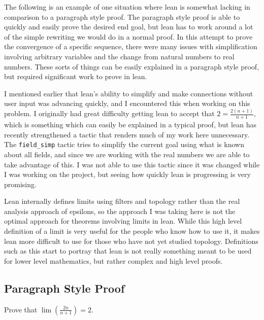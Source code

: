 \documentclass[
  letterpaper,
]{scrreprt}
\theoremstyle{remark}
\begin{document}
The following is an example of one situation where lean is somewhat
lacking in comparison to a paragraph style proof. The paragraph style
proof is able to quickly and easily prove the desired end goal, but lean
has to work around a lot of the simple rewriting we would do in a normal
proof. In this attempt to prove the convergence of a specific sequence,
there were many issues with simplification involving arbitrary variables
and the change from natural numbers to real numbers. These sorts of
things can be easily explained in a paragraph style proof, but required
significant work to prove in lean.

I mentioned earlier that lean's ability to simplify and make connections
without user input was advancing quickly, and I encountered this when
working on this problem. I originally had great difficulty getting lean
to accept that \(2 = \frac{2(n + 1)}{n + 1},\) which is something which
can easily be explained in a typical proof, but lean has recently
strengthened a tactic that renders much of my work here unnecessary. The
\texttt{field\_simp} tactic tries to simplify the current goal using
what is known about all fields, and since we are working with the real
numbers we are able to take advantage of this. I was not able to use
this tactic since it was changed while I was working on the project, but
seeing how quickly lean is progressing is very promising.

Lean internally defines limits using filters and topology rather than
the real analysis approach of epsilons, so the approach I was taking
here is not the optimal approach for theorems involving limits in lean.
While this high level definition of a limit is very useful for the
people who know how to use it, it makes lean more difficult to use for
those who have not yet studied topology. Definitions such as this start
to portray that lean is not really something meant to be used for lower
level mathematics, but rather complex and high level proofs.

\hypertarget{paragraph-style-proof-3}{%
\subsection{Paragraph Style Proof}\label{paragraph-style-proof-3}}

\begin{thm}
Prove that \(\lim(\frac{2n}{n + 1}) = 2.\)

\end{thm}
\end{document}
